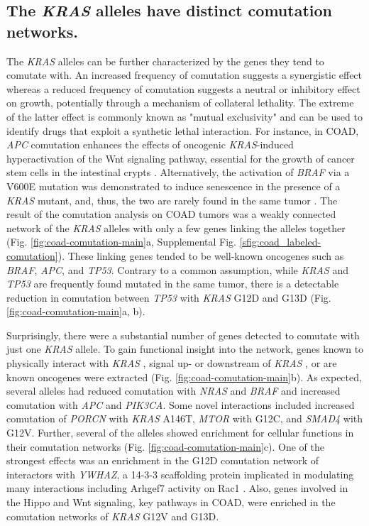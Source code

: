 \documentclass[english, 12pt, letterpaper]{article}
\newcommand{\KRAS}{\emph{KRAS}}
\begin{document}
\subsection*{The \KRAS{} alleles have distinct comutation networks.}

The \KRAS{} alleles can be further characterized by the genes they tend to comutate with.
An increased frequency of comutation suggests a synergistic effect whereas a reduced frequency of comutation suggests a neutral or inhibitory effect on growth, potentially through a mechanism of collateral lethality.
The extreme of the latter effect is commonly known as "mutual exclusivity" and can be used to identify drugs that exploit a synthetic lethal interaction.
For instance, in COAD, \emph{APC} comutation enhances the effects of oncogenic \KRAS{}-induced hyperactivation of the Wnt signaling pathway, essential for the growth of cancer stem cells in the intestinal crypts \cite{Janssen2006, Fearon2014, Sakai2018, Jauhri2017}.
Alternatively, the activation of \emph{BRAF} via a V600E mutation was demonstrated to induce senescence in the presence of a \KRAS{} mutant, and, thus, the two are rarely found in the same tumor \cite{Seth2009ConcomitantCancer., Cisowski2016, Jauhri2017}.
The result of the comutation analysis on COAD tumors was a weakly connected network of the \KRAS{} alleles with only a few genes linking the alleles together (Fig. \ref{fig:coad-comutation-main}a, Supplemental Fig. \ref{sfig:coad_labeled-comutation}).
These linking genes tended to be well-known oncogenes such as \emph{BRAF}, \emph{APC}, and \emph{TP53}.
Contrary to a common assumption, while \KRAS{} and \emph{TP53} are frequently found mutated in the same tumor, there is a detectable reduction in comutation between \emph{TP53} with \KRAS{} G12D and G13D (Fig. \ref{fig:coad-comutation-main}a, b).

Surprisingly, there were a substantial number of genes detected to comutate with just one \KRAS{} allele.
To gain functional insight into the network, genes known to physically interact with \KRAS{} \cite{Kovalski2019}, signal up- or downstream of \KRAS{} \cite{Kanehisa2017, Kanehisa2016KEGGAnnotation.}, or are known oncogenes \cite{Bamford2004TheWebsite., Sondka2018} were extracted (Fig. \ref{fig:coad-comutation-main}b).
As expected, several alleles had reduced comutation with \emph{NRAS} and \emph{BRAF} and increased comutation with \emph{APC} and \emph{PIK3CA}. Some novel interactions included increased comutation of \emph{PORCN} with \KRAS{} A146T, \emph{MTOR} with G12C, and \emph{SMAD4} with G12V.
Further, several of the alleles showed enrichment for cellular functions in their comutation networks (Fig. \ref{fig:coad-comutation-main}c).
One of the strongest effects was an enrichment in the G12D comutation network of interactors with \emph{YWHAZ}, a 14-3-3 scaffolding protein implicated in modulating many interactions including Arhgef7 activity on Rac1 \cite{Angrand2006TransgenicSignaling.}.
Also, genes involved in the Hippo and Wnt signaling, key pathways in COAD, were enriched in the comutation networks of \KRAS{} G12V and G13D.
\end{document}
